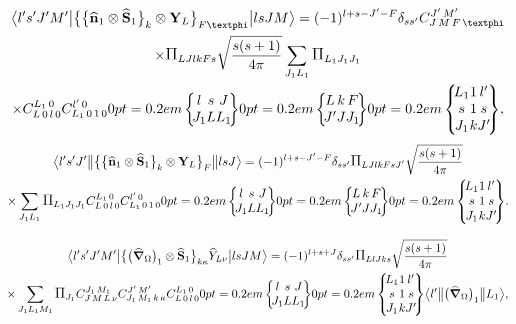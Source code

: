 \begin{multline}
\braOket{ l^{\prime} s^{\prime} J^{\prime} M^{\prime}}{\bigl\{\bigl\{\widehat{\vect{n}}_{1} \otimes \widehat{\vect{S}}_{1}\bigr\}_{k} \otimes \vect{Y}_{L}\bigr\}_{F \varphi}}{l s J M}=(-1)^{l+s-J^{\prime}-F} \delta_{s s^{\prime}} 
\clebsch{J}{M}{F}{\varphi}{J^{\prime}}{M^{\prime}} \\
 \times \Fact{L J l k F s}\sqrt{\frac{ s(s+1)}{4 \pi}} \sum_{J_{1} L_{1}}
\Fact{L_1 J_1 J_1} \\
 \times
\clebsch{L}{0}{l}{0}{L_{1}}{0}
\clebsch{L_{1}}{0}{1}{0}{l^{\prime}}{0}
\sixj{l}{s}{J}{J_{1}}{L}{L_{1}}
\sixj{L}{k}{F}{J^{\prime}}{J}{J_{1}}
\ninej{L_{1}}{1}{l^{\prime}}{s}{1}{s}{J_{1}}{k}{J^{\prime}},  \label{eq:13:2:135}
\end{multline}
\begin{multline*}
\braOketred{ l^{\prime} s^{\prime} J^{\prime}}{\bigl\{\bigl\{\widehat{\vect{n}}_{1} \otimes \widehat{\vect{S}}_{1}\bigr\}_{k} \otimes \vect{Y}_{L}\bigr\}_{F}}{l s J}=(-1)^{l+s-J^{\prime}-F} \delta_{s s^{\prime}} \Fact{L J l k F s J^{\prime}}\sqrt{\frac{ s(s+1)}{4 \pi}} \\
\times \sum_{J_{1} L_{1}}
\Fact{L_1 J_1 J_1}
\clebsch{L}{0}{l}{0}{L_{1}}{0}
\clebsch{L_{1}}{0}{1}{0}{l^{\prime}}{0}
\sixj{l}{s}{J}{J_{1}}{L}{L_{1}}
\sixj{L}{k}{F}{J^{\prime}}{J}{J_{1}}
\ninej{L_{1}}{1}{l^{\prime}}{s}{1}{s}{J_{1}}{k}{J^{\prime}}.
\end{multline*}

\begin{multline}
    \braOket{l's'J'M'}{\bigl\{\bigl(\delop_{\Omega}\bigr)_{1}\otimes\widehat{\vect{S}}_1\bigr\}_{k\kappa}\widehat{Y}_{L\nu}}{lsJM}=(-1)^{l+s+J}\delta_{ss'}
    \Fact{L l J k s}\sqrt{\frac{s(s+1)}{4\pi}}\\
 \times \sum_{J_{1} L_{1} M_{1}} \Fact{J_{1}} 
\clebsch{J}{M}{L}{\nu}{J_{1}}{M_{1}} 
\clebsch{J_{1}}{M_{1}}{k}{\kappa}{J^{\prime}}{M^{\prime}} 
\clebsch{L}{0}{l}{0}{L_{1}}{0}
\sixj{l}{s}{J}{J_{1}}{L}{L_{1}}
\ninej{L_{1}}{1}{l^{\prime}}{s}{1}{s}{J_{1}}{k}{J^{\prime}}
\braOketred{ l^{\prime}}{\bigl(\delop_{\Omega}\bigr)_{1}}{L_{1}}, \label{eq:13:2:136}
\end{multline}

